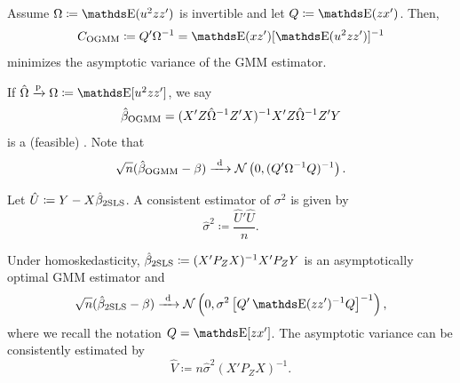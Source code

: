 \begin{proposition}
  Assume \(\Omega \coloneqq \E(u^2 zz')\) is invertible and let \(Q \coloneqq \E(zx')\).
  Then,
  \begin{align*}
    C_{\OGMM}
    &\coloneqq Q' \Omega^{-1} = \E(xz') [\E(u^2 zz')]^{-1} \\
  \end{align*}
  minimizes the asymptotic variance of the GMM estimator.
\end{proposition}

\begin{proposition}
  If \(\hat{\Omega} \probto \Omega \coloneqq \E[u^2 zz']\), we say
  \[
    \hat{\beta}_{\operatorname{OGMM}}
    = (X' Z \hat{\Omega}^{-1} Z' X)^{-1} X' Z \hat{\Omega}^{-1} Z' Y
  \]
  is a (feasible) .
  Note that
  \[
    \sqrt{n} (\hat{\beta}_{\operatorname{OGMM}} - \beta)
    \xrightarrow{\ \mathrm{d}\ } \mathcal{N}\left( 0, (Q' \Omega^{-1} Q)^{-1} \right).
  \]
\end{proposition}

\begin{proposition}
  Let \(\hat{U} \coloneqq Y - X \hat{\beta}_{\operatorname{2SLS}}\).
  A consistent estimator of \(\sigma^2\) is given by
  \[
    \hat{\sigma}^2
    \coloneqq \frac{\hat{U}' \hat{U}}{n}.
  \]
\end{proposition}

\begin{proposition}
  Under homoskedasticity, \(\hat{\beta}_{\operatorname{2SLS}} \coloneqq (X' P_Z X)^{-1} X' P_Z Y\) is an asymptotically optimal GMM estimator and 
  \[
    \sqrt{n} (\hat{\beta}_{\TSLS} - \beta)
    \longdistto \Normal\left( 0, \sigma^2 \left[ Q' \E(zz')^{-1} Q \right]^{-1} \right),
  \]
  where we recall the notation \(Q = \E[zx']\).
  The asymptotic variance can be consistently estimated by
  \[
    \hat{V}
    \coloneqq n \hat{\sigma}^2 (X' P_Z X)^{-1}.
  \]
\end{proposition}

